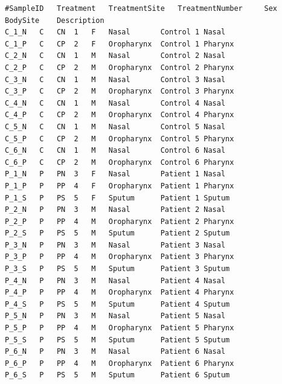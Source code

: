 \documentclass[
]{book}
\newenvironment{Shaded}{\begin{snugshade}}{\end{snugshade}}
\newcommand{\BuiltInTok}[1]{#1}
\newcommand{\CommentTok}[1]{\textcolor[rgb]{0.56,0.35,0.01}{\textit{#1}}}
\newcommand{\FunctionTok}[1]{\textcolor[rgb]{0.00,0.00,0.00}{#1}}
\newcommand{\NormalTok}[1]{#1}
\newcommand{\VariableTok}[1]{\textcolor[rgb]{0.00,0.00,0.00}{#1}}
\begin{document}
\begin{verbatim}
#SampleID   Treatment   TreatmentSite   TreatmentNumber     Sex     BodySite    Description 
C_1_N   C   CN  1   F   Nasal       Control 1 Nasal 
C_1_P   C   CP  2   F   Oropharynx  Control 1 Pharynx 
C_2_N   C   CN  1   M   Nasal       Control 2 Nasal 
C_2_P   C   CP  2   M   Oropharynx  Control 2 Pharynx 
C_3_N   C   CN  1   M   Nasal       Control 3 Nasal 
C_3_P   C   CP  2   M   Oropharynx  Control 3 Pharynx 
C_4_N   C   CN  1   M   Nasal       Control 4 Nasal 
C_4_P   C   CP  2   M   Oropharynx  Control 4 Pharynx 
C_5_N   C   CN  1   M   Nasal       Control 5 Nasal 
C_5_P   C   CP  2   M   Oropharynx  Control 5 Pharynx 
C_6_N   C   CN  1   M   Nasal       Control 6 Nasal 
C_6_P   C   CP  2   M   Oropharynx  Control 6 Pharynx 
P_1_N   P   PN  3   F   Nasal       Patient 1 Nasal 
P_1_P   P   PP  4   F   Oropharynx  Patient 1 Pharynx 
P_1_S   P   PS  5   F   Sputum      Patient 1 Sputum 
P_2_N   P   PN  3   M   Nasal       Patient 2 Nasal 
P_2_P   P   PP  4   M   Oropharynx  Patient 2 Pharynx 
P_2_S   P   PS  5   M   Sputum      Patient 2 Sputum 
P_3_N   P   PN  3   M   Nasal       Patient 3 Nasal 
P_3_P   P   PP  4   M   Oropharynx  Patient 3 Pharynx 
P_3_S   P   PS  5   M   Sputum      Patient 3 Sputum 
P_4_N   P   PN  3   M   Nasal       Patient 4 Nasal 
P_4_P   P   PP  4   M   Oropharynx  Patient 4 Pharynx 
P_4_S   P   PS  5   M   Sputum      Patient 4 Sputum 
P_5_N   P   PN  3   M   Nasal       Patient 5 Nasal 
P_5_P   P   PP  4   M   Oropharynx  Patient 5 Pharynx 
P_5_S   P   PS  5   M   Sputum      Patient 5 Sputum 
P_6_N   P   PN  3   M   Nasal       Patient 6 Nasal 
P_6_P   P   PP  4   M   Oropharynx  Patient 6 Pharynx 
P_6_S   P   PS  5   M   Sputum      Patient 6 Sputum 
\end{verbatim}

\begin{Shaded}
\end{Shaded}
\end{document}
